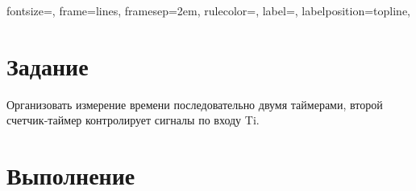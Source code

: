 

\isonefalse
\def \labnum {5}
\def \labsubj {Организация ЭВМ и систем}
\def \labauthor {Айтуганов Д. А. \\ Чебыкин И. Б. \\ Губарев В. Ю. \\ Насыров К.}
\def \labgroup {P3301}
\def \labinsp {Скорубский В. И.}
\def \labname {}

\isnametrue
\lstset{
	caption=\lstname,
	basicstyle=\ttfamily\selectfont\scriptsize
}

\usepackage[dvipsnames]{xcolor}
\usepackage{fancyvrb}

 {
 fontsize=\scriptsize,
 frame=lines,  %
 framesep=2em, %
 rulecolor=\color{Gray},
 label=,
 labelposition=topline,
}


\section{Задание}
Организовать измерение времени последовательно двумя таймерами, второй
счетчик-таймер контролирует сигналы по входу Ti.
\section{Выполнение}

